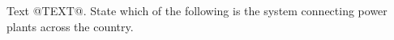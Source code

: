 Text @TEXT@. State which of the following is the system 
connecting power plants across the country.